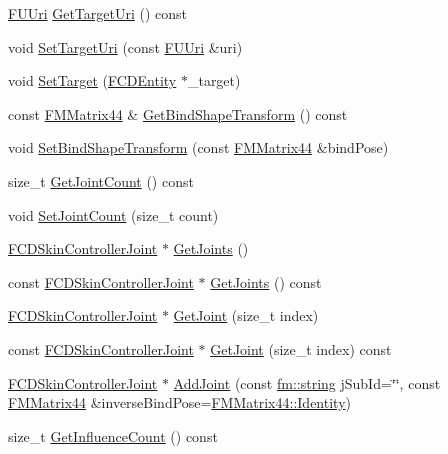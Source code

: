 \begin{DoxyCompactItemize}
\item 
\hyperlink{classFUUri}{FUUri} \hyperlink{classFCDSkinController_ab4fdf1c8972ebe67b9ccbdf5b32f5e04}{GetTargetUri} () const 
\item 
void \hyperlink{classFCDSkinController_aba227b645b30f43847dad3246ed34132}{SetTargetUri} (const \hyperlink{classFUUri}{FUUri} \&uri)
\item 
void \hyperlink{classFCDSkinController_a570337f366b9760bf1828620541c130b}{SetTarget} (\hyperlink{classFCDEntity}{FCDEntity} $\ast$\_\-target)
\item 
const \hyperlink{classFMMatrix44}{FMMatrix44} \& \hyperlink{classFCDSkinController_afdd606f592acbdbb18e987dd7ac7f526}{GetBindShapeTransform} () const 
\item 
void \hyperlink{classFCDSkinController_a98e96fb0d648822f57ac2f94a2d13c63}{SetBindShapeTransform} (const \hyperlink{classFMMatrix44}{FMMatrix44} \&bindPose)
\item 
size\_\-t \hyperlink{classFCDSkinController_a4ec9325fef3ed3ed837eb99e82b79f35}{GetJointCount} () const 
\item 
void \hyperlink{classFCDSkinController_a6f6527350df3b392a9aed68834afde5a}{SetJointCount} (size\_\-t count)
\item 
\hyperlink{classFCDSkinControllerJoint}{FCDSkinControllerJoint} $\ast$ \hyperlink{classFCDSkinController_a9bdb04c9a9c464828c50e23883ac27ff}{GetJoints} ()
\item 
const \hyperlink{classFCDSkinControllerJoint}{FCDSkinControllerJoint} $\ast$ \hyperlink{classFCDSkinController_a3cefba7450f5ffd20eb50ce94930dace}{GetJoints} () const 
\item 
\hyperlink{classFCDSkinControllerJoint}{FCDSkinControllerJoint} $\ast$ \hyperlink{classFCDSkinController_a6122344e78bf79eac5d98146eea8ccf1}{GetJoint} (size\_\-t index)
\item 
const \hyperlink{classFCDSkinControllerJoint}{FCDSkinControllerJoint} $\ast$ \hyperlink{classFCDSkinController_a7ea6ffb632099285cc81b9dbe05a4b07}{GetJoint} (size\_\-t index) const 
\item 
\hyperlink{classFCDSkinControllerJoint}{FCDSkinControllerJoint} $\ast$ \hyperlink{classFCDSkinController_a0f7a20bb077328f9f6b58daf95ac9a20}{AddJoint} (const \hyperlink{classfm_1_1stringT}{fm::string} jSubId=\char`\"{}\char`\"{}, const \hyperlink{classFMMatrix44}{FMMatrix44} \&inverseBindPose=\hyperlink{classFMMatrix44_a6ec620d68ab61a95e3b4b5f7e7300468}{FMMatrix44::Identity})
\item 
size\_\-t \hyperlink{classFCDSkinController_a672679bbfe60f04d6309fd99cebb15c3}{GetInfluenceCount} () const 

\end{DoxyCompactItemize}
